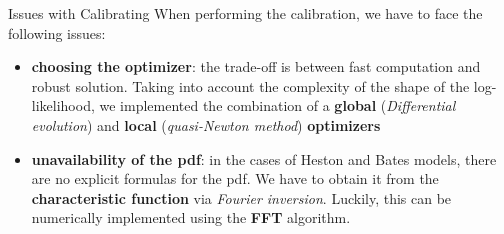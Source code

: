 \documentclass[c, 10pt]{beamer}
\begin{document}
\begin{frame}{Issues with Calibrating}
When performing the calibration, we have to face the following issues:
\begin{itemize}
	\item \textbf{choosing the optimizer}: the trade-off is between fast computation and robust solution. Taking into account the complexity of the shape of the log-likelihood, we implemented the combination of a \textbf{global} (\textit{Differential evolution}) and \textbf{local} (\textit{quasi-Newton method}) \textbf{optimizers}
	\item \textbf{unavailability of the pdf}: in the cases of Heston and Bates models, there are no explicit formulas for the pdf. We have to obtain it from the \textbf{characteristic function} via \textit{Fourier inversion}. Luckily, this can be numerically implemented using the \textbf{FFT} algorithm.
\end{itemize}
\end{frame}
\end{document}
